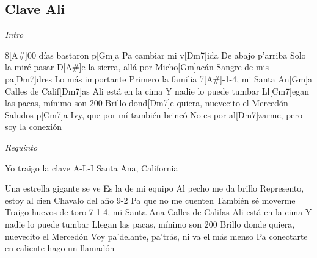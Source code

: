 \subsection{Clave Ali}
\noindent

\vspace{1cm}

\begin{guitar}
	\begin{multicols}{2}
		\textit{Intro}
		\par

		8[A#]00 días bastaron p[Gm]a
		Pa cambiar mi v[Dm7]ida
		De abajo p'arriba
		Solo la miré pasar
		D[A#]e la sierra, allá por Micho[Gm]acán
		Sangre de mis pa[Dm7]dres
		Lo más importante
		Primero la familia
		7[A#]-1-4, mi Santa An[Gm]a
		Calles de Calif[Dm7]as
		Ali está en la cima
		Y nadie lo puede tumbar
		Ll[Cm7]egan las pacas, mínimo son 200
		Brillo dond[Dm7]e quiera, nuevecito el Mercedón
		Saludos p[Cm7]a Ivy, que por mí también brincó
		No es por al[Dm7]zarme, pero soy la conexión
		\par
		\textit{Requinto}
		\par

		Yo traigo la clave A-L-I
		Santa Ana, California
		\par
		Una estrella gigante se ve
		Es la de mi equipo
		Al pecho me da brillo
		Represento, estoy al cien
		Chavalo del año 9-2
		Pa que no me cuenten
		También sé moverme
		Traigo huevos de toro
		7-1-4, mi Santa Ana
		Calles de Califas
		Ali está en la cima
		Y nadie lo puede tumbar
		Llegan las pacas, mínimo son 200
		Brillo donde quiera, nuevecito el Mercedón
		Voy pa'delante, pa'trás, ni va el más menso
		Pa conectarte en caliente hago un llamadón

	\end{multicols}
\end{guitar}
